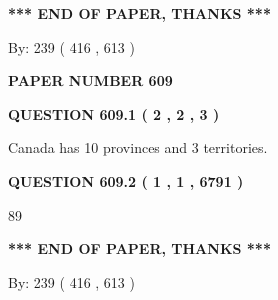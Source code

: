 \documentclass[12pt]{article}
\begin{document}
   
   
\vspace{1.0in} 
{\textbf{\large{ *** END OF PAPER, THANKS *** }}} 
   
   
\hspace{1.0in} By: 
 239 ( 416 ,  613 )
   
   
   
   
\newpage 
\setcounter{page}{ 
   609001 } 
   
   
   
   
 {\textbf{ \Large{ PAPER NUMBER  609  }}}
   
   
\vspace{0.2in}
   
   
   
   
   
   
 \vspace{0.2in}
 
 
 
 
   
   
  
\vspace{0.2in}
  
{\textbf{\Large{QUESTION
609.1 
 ( 2 , 2 , 3 )
}}}
  
  
 
 
\noindent{}
 
 
Canada has 10  provinces and 3 territories.
 
 
 
 
  
\vspace{0.2in}
  
{\textbf{\Large{QUESTION
609.2 
 ( 1 , 1 , 6791 )
}}}
  
  
 
 
\noindent{}

89
 
 
   
   
 \vspace{0.2in}
 
   
   
   
   
\vspace{1.0in} 
{\textbf{\large{ *** END OF PAPER, THANKS *** }}} 
   
   
\hspace{1.0in} By: 
 239 ( 416 ,  613 )
   
\end{document}
